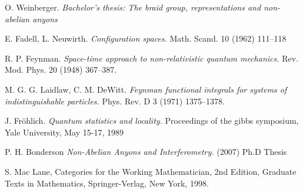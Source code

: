 \documentclass[a4paper,10pt,oneside]{book}
\theoremstyle{plain}
\theoremstyle{definition}
\theoremstyle{remark}
\begin{document}
\begin{thebibliography}{99}
    O. Weinberger.
    \textit{Bachelor's thesis: The braid group, representations and non-abelian anyons}

    E. Fadell, L. Neuwirth.
    \textit{Configuration spaces.}
    Math. Scand. 10 (1962) 111–118

    R. P. Feynman.
    \textit{Space-time approach to non-relativistic quantum mechanics.}
    Rev. Mod. Phys. 20 (1948) 367–387.

    M. G. G. Laidlaw, C. M. DeWitt.
    \textit{Feynman functional integrals for systems of indistinguishable particles.}
    Phys. Rev. D 3 (1971) 1375–1378.

    J. Fröhlich.
    \textit{Quantum statistics and locality.}
    Proceedings of the gibbs symposium,
    Yale University, May 15-17, 1989

    P. H. Bonderson
    \textit{Non-Abelian Anyons and Interferometry.}
    (2007) Ph.D Thesis

    S. Mac Lane, Categories for the Working Mathematician, 2nd Edition, Graduate Texts in Mathematics, Springer-Verlag, New York, 1998.

\end{thebibliography}
\end{document}
